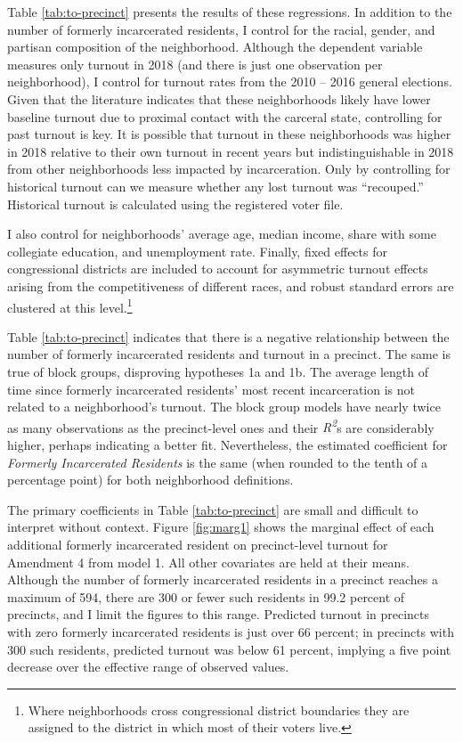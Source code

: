 \documentclass[
  12pt,
]{article}
\begin{document}
Table \ref{tab:to-precinct} presents the results of these regressions. In addition to the number of formerly incarcerated residents, I control for the racial, gender, and partisan composition of the neighborhood. Although the dependent variable measures only turnout in 2018 (and there is just one observation per neighborhood), I control for turnout rates from the 2010 -- 2016 general elections. Given that the literature indicates that these neighborhoods likely have lower baseline turnout due to proximal contact with the carceral state, controlling for past turnout is key. It is possible that turnout in these neighborhoods was higher in 2018 relative to their own turnout in recent years but indistinguishable in 2018 from other neighborhoods less impacted by incarceration. Only by controlling for historical turnout can we measure whether any lost turnout was ``recouped.'' Historical turnout is calculated using the registered voter file.

I also control for neighborhoods' average age, median income, share with some collegiate education, and unemployment rate. Finally, fixed effects for congressional districts are included to account for asymmetric turnout effects arising from the competitiveness of different races, and robust standard errors are clustered at this level.\footnote{Where neighborhoods cross congressional district boundaries they are assigned to the district in which most of their voters live.}

\begin{singlespace}


\end{singlespace}

Table \ref{tab:to-precinct} indicates that there is a negative relationship between the number of formerly incarcerated residents and turnout in a precinct. The same is true of block groups, disproving hypotheses 1a and 1b. The average length of time since formerly incarcerated residents' most recent incarceration is not related to a neighborhood's turnout. The block group models have nearly twice as many observations as the precinct-level ones and their \emph{R\textsuperscript{2}}s are considerably higher, perhaps indicating a better fit. Nevertheless, the estimated coefficient for \emph{Formerly Incarcerated Residents} is the same (when rounded to the tenth of a percentage point) for both neighborhood definitions.

The primary coefficients in Table \ref{tab:to-precinct} are small and difficult to interpret without context. Figure \ref{fig:marg1} shows the marginal effect of each additional formerly incarcerated resident on precinct-level turnout for Amendment 4 from model 1. All other covariates are held at their means. Although the number of formerly incarcerated residents in a precinct reaches a maximum of 594, there are 300 or fewer such residents in 99.2 percent of precincts, and I limit the figures to this range. Predicted turnout in precincts with zero formerly incarcerated residents is just over 66 percent; in precincts with 300 such residents, predicted turnout was below 61 percent, implying a five point decrease over the effective range of observed values.
\end{document}
